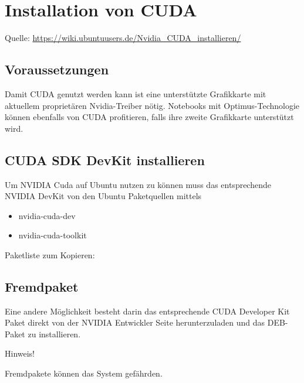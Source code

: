 \chapter{Installation von CUDA}

{\tiny Quelle: \url{https://wiki.ubuntuusers.de/Nvidia_CUDA_installieren/}}


\section{Voraussetzungen}

Damit CUDA genutzt werden kann ist eine unterstützte Grafikkarte mit aktuellem proprietären Nvidia-Treiber nötig. Notebooks mit Optimus-Technologie können ebenfalls von CUDA profitieren, falls ihre zweite Grafikkarte unterstützt wird.

\section{CUDA SDK DevKit installieren}

Um NVIDIA Cuda auf Ubuntu nutzen zu können muss das entsprechende NVIDIA DevKit von den Ubuntu Paketquellen mittels

\begin{itemize}
  \item nvidia-cuda-dev 
  \item nvidia-cuda-toolkit
\end{itemize} 

\bigskip

Paketliste zum Kopieren: 

\medskip


\medskip



\section{Fremdpaket}

Eine andere Möglichkeit besteht darin das entsprechende CUDA Developer Kit Paket direkt von der NVIDIA Entwickler Seite herunterzuladen und das DEB-Paket zu installieren. 

\bigskip

Hinweis!

\bigskip

Fremdpakete können das System gefährden. 

\bigskip

